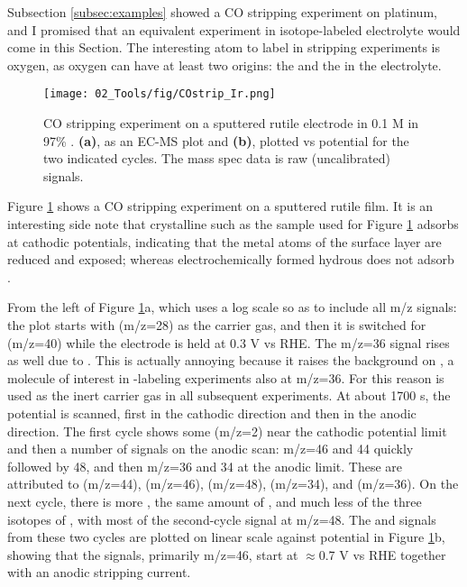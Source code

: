 Subsection \ref{subsec:examples} showed a CO stripping experiment on platinum, and I promised that an equivalent experiment in isotope-labeled electrolyte would come in this Section. The interesting atom to label in  stripping experiments is oxygen, as oxygen can have at least two origins: the  and the  in the electrolyte.

\begin{figure}[h!]
	\centering
	\texttt{[image: 02\_Tools/fig/COstrip\_Ir.png]}
	\caption{CO stripping experiment on a sputtered rutile  electrode in 0.1 M  in 97\% . \textbf{(a)}, as an EC-MS plot and \textbf{(b)}, plotted vs potential for the two indicated cycles. The mass spec data is raw (uncalibrated) signals.}
	\label{fig:IrO2_COstrip}
\end{figure}

Figure \ref{fig:IrO2_COstrip} shows a CO stripping experiment on a sputtered rutile  film. It is an interesting side note that crystalline  such as the sample used for Figure \ref{fig:IrO2_COstrip} adsorbs  at cathodic potentials, indicating that the metal atoms of the surface layer are reduced and exposed; whereas electrochemically formed hydrous  does not adsorb . 

From the left of Figure \ref{fig:IrO2_COstrip}a, which uses a log scale so as to include all m/z signals: the plot starts with  (m/z=28) as the carrier gas, and then it is switched for  (m/z=40) while the electrode is held at 0.3 V vs RHE. The m/z=36 signal rises as well due to . This is actually annoying because it raises the background on , a molecule of interest in -labeling experiments also at m/z=36. For this reason  is used as the inert carrier gas in all subsequent  experiments. At about 1700 s, the potential is scanned, first in the cathodic direction and then in the anodic direction. The first cycle shows some  (m/z=2) near the cathodic potential limit and then a number of signals on the anodic scan: m/z=46 and 44 quickly followed by 48, and then m/z=36 and 34 at the anodic limit. These are attributed to  (m/z=44),  (m/z=46),  (m/z=48),  (m/z=34), and  (m/z=36). On the next cycle, there is more , the same amount of , and much less of the three isotopes of , with most of the second-cycle  signal at m/z=48. The  and  signals from these two cycles are plotted on linear scale against potential in Figure \ref{fig:IrO2_COstrip}b, showing that the  signals, primarily m/z=46, start at $\approx$0.7 V vs RHE together with an anodic stripping current. 
	
